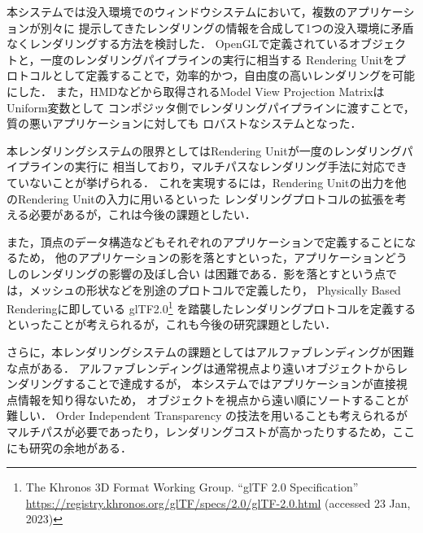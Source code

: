 
本システムでは没入環境でのウィンドウシステムにおいて，複数のアプリケーションが別々に
提示してきたレンダリングの情報を合成して1つの没入環境に矛盾なくレンダリングする方法を検討した．
OpenGLで定義されているオブジェクトと，一度のレンダリングパイプラインの実行に相当する
Rendering Unitをプロトコルとして定義することで，効率的かつ，自由度の高いレンダリングを可能にした．
また，HMDなどから取得されるModel View Projection MatrixはUniform変数として
コンポジッタ側でレンダリングパイプラインに渡すことで，質の悪いアプリケーションに対しても
ロバストなシステムとなった．

本レンダリングシステムの限界としてはRendering Unitが一度のレンダリングパイプラインの実行に
相当しており，マルチパスなレンダリング手法に対応できていないことが挙げられる．
これを実現するには，Rendering Unitの出力を他のRendering Unitの入力に用いるといった
レンダリングプロトコルの拡張を考える必要があるが，これは今後の課題としたい．

また，頂点のデータ構造などもそれぞれのアプリケーションで定義することになるため，
他のアプリケーションの影を落とすといった，アプリケーションどうしのレンダリングの影響の及ぼし合い
は困難である．影を落とすという点では，メッシュの形状などを別途のプロトコルで定義したり，
Physically Based Rendering\cite{physically-based-rendering}に即している
glTF2.0\footnote{The Khronos 3D Format Working Group. ``glTF 2.0 Specification'' \url{https://registry.khronos.org/glTF/specs/2.0/glTF-2.0.html} (accessed 23 Jan, 2023)}
を踏襲したレンダリングプロトコルを定義するといったことが考えられるが，これも今後の研究課題としたい．

さらに，本レンダリングシステムの課題としてはアルファブレンディングが困難な点がある．
アルファブレンディングは通常視点より遠いオブジェクトからレンダリングすることで達成するが，
本システムではアプリケーションが直接視点情報を知り得ないため，
オブジェクトを視点から遠い順にソートすることが難しい．
Order Independent Transparency の技法を用いることも考えられるが
マルチパスが必要であったり，レンダリングコストが高かったりするため，ここにも研究の余地がある．
